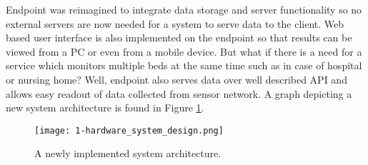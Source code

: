 Endpoint was reimagined to integrate data storage and server functionality so no external servers are now needed for a system to serve data to the client. Web based user interface is also implemented on the endpoint so that results can be viewed from a \ac{PC} or even from a mobile device. But what if there is a need for a service which monitors multiple beds at the same time such as in case of hospital or nursing home? Well, endpoint also serves data over well described API and allows easy readout of data collected from sensor network. A graph depicting a new system architecture is found in Figure \ref{fig:sys_architecture}.

\begin{figure}[h]
  \begin{center}
    \texttt{[image: 1-hardware\_system\_design.png]}
  \end{center}
  \caption{A newly implemented system architecture.}
  \label{fig:sys_architecture}
\end{figure}